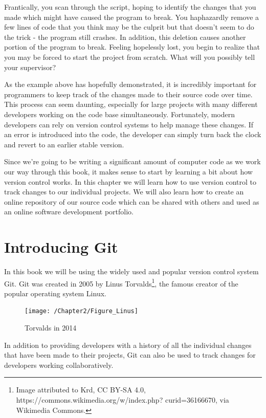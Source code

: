 \documentclass{book}
\begin{document}
Frantically, you scan through the script, hoping to identify the changes that you made which might have caused the program to break. You haphazardly remove a few lines of code that you think may be the culprit but that doesn't seem to do the trick - the program still crashes. In addition, this deletion causes another portion of the program to break. Feeling hopelessly lost, you begin to realize that you may be forced to start the project from scratch. What will you possibly tell your supervisor?

As the example above has hopefully demonstrated, it is incredibly important for programmers to keep track of the changes made to their source code over time. This process can seem daunting, especially for large projects with many different developers working on the code base simultaneously. Fortunately, modern developers can rely on version control systems to help manage these changes. If an error is introduced into the code, the developer can simply turn back the clock and revert to an earlier stable version. 

Since we're going to be writing a significant amount of computer code as we work our way through this book, it makes sense to start by learning a bit about how version control works. In this chapter we will learn how to use version control to track changes to our individual projects. We will also learn how to create an online repository of our source code which can be shared with others and used as an online software development portfolio.

\section{Introducing Git}

In this book we will be using the widely used and popular version control system Git\texttrademark. Git was created in 2005 by Linus Torvalds\footnote {Image attributed to Krd, CC BY-SA 4.0, https://commons.wikimedia.org/w/index.php?
curid=36166670, via Wikimedia Commons.}, the famous creator of the popular operating system Linux. 

\begin{figure}[h]
	\caption{Torvalds in 2014}
	\centering\texttt{[image: /Chapter2/Figure\_Linus]}
\end{figure}

In addition to providing developers with a history of all the individual changes that have been made to their projects, Git can also be used to track changes for developers working collaboratively. 
\end{document}
